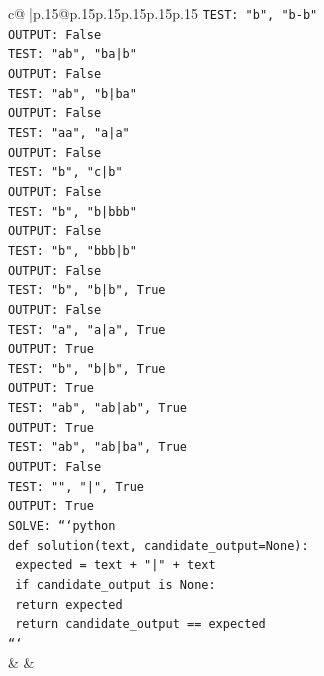 \documentclass{article}
\begin{document}
{\begin{supertabular}{c@{$\;$}|p{.15\linewidth}@{}p{.15\linewidth}p{.15\linewidth}p{.15\linewidth}p{.15\linewidth}p{.15\linewidth}}
{{{\texttt{TEST: "b", "b{-}b"} \\
\texttt{OUTPUT: False} \\
\texttt{TEST: "ab", "ba|b"} \\
\texttt{OUTPUT: False} \\
\texttt{TEST: "ab", "b|ba"} \\
\texttt{OUTPUT: False} \\
\texttt{TEST: "aa", "a|a"} \\
\texttt{OUTPUT: False} \\
\texttt{TEST: "b", "c|b"} \\
\texttt{OUTPUT: False} \\
\texttt{TEST: "b", "b|bbb"} \\
\texttt{OUTPUT: False} \\
\texttt{TEST: "b", "bbb|b"} \\
\texttt{OUTPUT: False} \\
\texttt{TEST: "b", "b|b", True} \\
\texttt{OUTPUT: False} \\
\texttt{TEST: "a", "a|a", True} \\
\texttt{OUTPUT: True} \\
\texttt{TEST: "b", "b|b", True} \\
\texttt{OUTPUT: True} \\
\texttt{TEST: "ab", "ab|ab", True} \\
\texttt{OUTPUT: True} \\
\texttt{TEST: "ab", "ab|ba", True} \\
\texttt{OUTPUT: False} \\
\texttt{TEST: "", "|", True} \\
\texttt{OUTPUT: True} \\
\texttt{SOLVE: ```python} \\
\texttt{def solution(text, candidate\_output=None):} \\
\texttt{    expected = text + "|" + text} \\
\texttt{    if candidate\_output is None:} \\
\texttt{        return expected} \\
\texttt{    return candidate\_output == expected} \\
\texttt{```} \\
            }
        }
    }
    & & \\ \\


\end{supertabular}}
\end{document}
